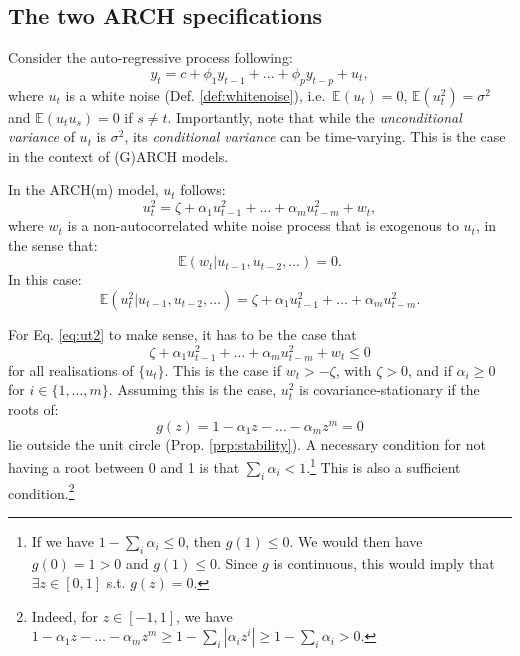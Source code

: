 \documentclass[
  12pt,
]{book}
\theoremstyle{definition}
\theoremstyle{definition}
\theoremstyle{definition}
\theoremstyle{definition}
\theoremstyle{remark}
\begin{document}
\hypertarget{the-two-arch-specifications}{%
\subsection{The two ARCH specifications}\label{the-two-arch-specifications}}

Consider the auto-regressive process following:
\begin{equation}
y_t = c + \phi_1 y_{t-1} + \dots + \phi_p y_{t-p} + u_t,\label{eq:linearreg}
\end{equation}
where \(u_t\) is a white noise (Def. \ref{def:whitenoise}), i.e.~\(\mathbb{E}(u_t)=0\), \(\mathbb{E}(u_t^2)=\sigma^2\) and \(\mathbb{E}(u_t u_s)=0\) if \(s \ne t\). Importantly, note that while the \emph{unconditional variance} of \(u_t\) is \(\sigma^2\), its \emph{conditional variance} can be time-varying. This is the case in the context of (G)ARCH models.

In the ARCH(m) model, \(u_t\) follows:
\begin{equation}
u_t^2 = \zeta + \alpha_1 u_{t-1}^2 + \dots + \alpha_m u_{t-m}^2 + w_t,\label{eq:ut2}
\end{equation}
where \(w_t\) is a non-autocorrelated white noise process that is exogenous to \(u_t\), in the sense that:
\[
\mathbb{E}(w_t|u_{t-1},u_{t-2},\dots)=0.
\]
In this case:
\begin{equation}
\mathbb{E}(u_t^2|u_{t-1},u_{t-2},\dots) = \zeta + \alpha_1 u_{t-1}^2 + \dots + \alpha_m u_{t-m}^2.\label{eq:condvar}
\end{equation}

For Eq. \eqref{eq:ut2} to make sense, it has to be the case that
\[
\zeta + \alpha_1 u_{t-1}^2 + \dots + \alpha_m u_{t-m}^2 + w_t \le 0
\]
for all realisations of \(\{u_t\}\). This is the case if \(w_t > -\zeta\), with \(\zeta>0\), and if \(\alpha_i \ge 0\) for \(i \in \{1,\dots,m\}\). Assuming this is the case, \(u_t^2\) is covariance-stationary if the roots of:
\[
g(z) = 1 - \alpha_1 z - \dots - \alpha_m z^m = 0
\]
lie outside the unit circle (Prop. \ref{prp:stability}). A necessary condition for not having a root between 0 and 1 is that \(\sum_i \alpha_i<1\).\footnote{If we have \(1-\sum_i \alpha_i \le 0\), then \(g(1) \le 0\). We would then have \(g(0)=1>0\) and \(g(1)\le 0\). Since \(g\) is continuous, this would imply that \(\exists z \in [0,1]\) s.t. \(g(z)=0\).} This is also a sufficient condition.\footnote{Indeed, for \(z \in [-1,1]\), we have \(1 - \alpha_1 z - \dots - \alpha_m z^m \ge 1 - \sum_i |\alpha_iz^i| \ge 1 - \sum_i \alpha_i > 0\).}
\end{document}
